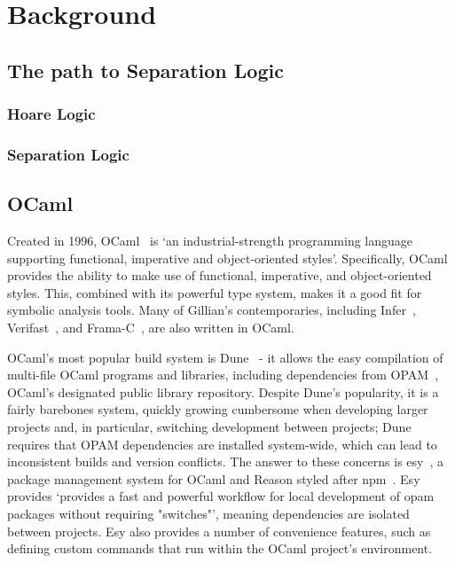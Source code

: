\chapter{Background}
\label{sec:background}

\section{The path to Separation Logic}
\subsection{Hoare Logic}

\subsection{Separation Logic}

\section{OCaml}

Created in 1996, OCaml~\cite{ocaml} is `an industrial-strength programming
language supporting functional, imperative and object-oriented styles'.
Specifically, OCaml provides the ability to make use of functional, imperative,
and object-oriented styles. This, combined with its powerful type system,
makes it a good fit for symbolic analysis tools. Many of Gillian's
contemporaries, including Infer~\cite{infer},
Verifast~\cite{verifast-paper, verifast-repo}, and Frama-C~\cite{frama-c}, are
also written in OCaml.

OCaml's most popular build system is Dune~\cite{dune} - it allows the easy
compilation of multi-file OCaml programs and libraries, including dependencies
from OPAM~\cite{opam}, OCaml's designated public library repository. Despite
Dune's popularity, it is a fairly barebones system, quickly growing cumbersome
when developing larger projects and, in particular, switching development
between projects; Dune requires that OPAM dependencies are installed
system-wide, which can lead to inconsistent builds and version conflicts. The
answer to these concerns is esy~\cite{esy}, a package management system for
OCaml and Reason styled after npm~\cite{npm}. Esy provides `provides a fast and
powerful workflow for local development of opam packages without requiring
"switches"', meaning dependencies are isolated between projects. Esy also
provides a number of convenience features, such as defining custom commands
that run within the OCaml project's environment.


